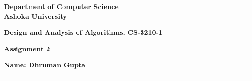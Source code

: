 \documentclass[a4paper]{article}
\begin{document}
\begin{center}
{\large \bf \color{red}  Department of Computer Science} \\
{\large \bf \color{red}  Ashoka University} \\

\vspace{0.1in}

{\large \bf \color{blue}  Design and Analysis of Algorithms: CS-3210-1}

\vspace{0.05in}

    { \bf \color{YellowOrange} Assignment 2}
\end{center}
\medskip

{\textbf{Name: Dhruman Gupta} }

\bigskip
\hrule
\end{document}
